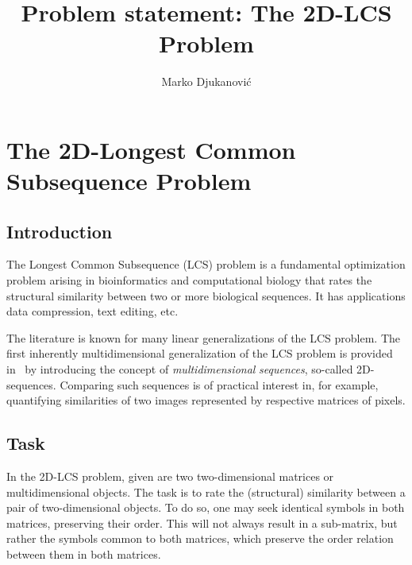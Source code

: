 \documentclass[]{article}
\title{\textbf{Problem statement: The 2D-LCS Problem} }
\author{Marko Djukanović}
\begin{document}
\maketitle



\section{The 2D-Longest Common Subsequence Problem}

\subsection{Introduction}

The Longest Common Subsequence (LCS) problem is a fundamental optimization problem arising in bioinformatics and computational biology that rates the structural similarity between two or more biological sequences.
It has applications data compression, text editing, etc.  

The literature is known for many linear generalizations of the LCS problem. The first inherently multidimensional generalization of the LCS problem is provided in~\cite{2d_lcs_amir} by introducing the concept of \textit{multidimensional} \textit{sequences}, so-called 2D-sequences. Comparing such sequences is of practical interest in, for example, quantifying similarities of two images represented by respective matrices of pixels. 


\subsection{Task}

In the 2D-LCS problem, given are two two-dimensional matrices or multidimensional objects. The task is 
to  rate the (structural) similarity
between a pair of two-dimensional objects.
To do so, one may seek identical symbols in both matrices, preserving their order. This will not always result in a sub-matrix, but rather the
symbols common to both matrices, which preserve the order relation between them in both matrices.   



\end{document}
